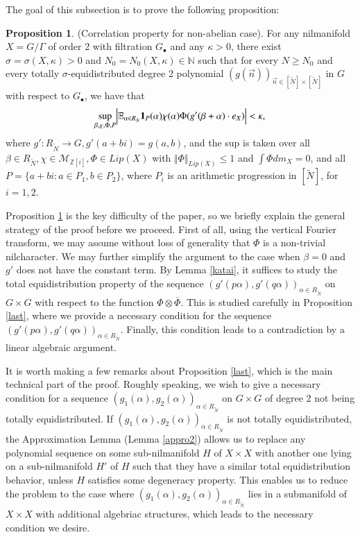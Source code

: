 \documentclass[12pt,amstex]{amsart}
\theoremstyle{definition}
\newtheorem{prop}[thm]{Proposition}
\def \Z {\mathbb{Z}[i]}
\def \A {\alpha}
\def \B {\beta}
\def \D {\kappa}
\def \R {R_{\tilde{N}}}
\begin{document}
The goal of this subsection is to prove the following proposition:

\begin{prop}\label{est1}(Correlation property for non-abelian case).
  For any nilmanifold $X=G/\Gamma$ of order 2 with filtration $G_{\bullet}$ and any $\D>0$, there exist $\sigma=\sigma(X,\D)>0$ and $N_{0}=N_{0}(X,\D)\in\mathbb{N}$ such that for every $N\geq N_{0}$ and every totally $\sigma$-equidistributed degree 2 polynomial $(g(\vec{n}))_{\vec{n}\in[\tilde{N}]\times[\tilde{N}]}$ in $G$ with respect to $G_{\bullet}$, we have that
  \begin{equation}\nonumber
  \begin{split}
    \sup_{\B,\chi,\Phi,P}\Bigl\vert\mathbb{E}_{\A\in \R}\bold{1}_{P}(\A)\chi(\A)\Phi(g'(\B+\A)\cdot e_{X})\Bigr\vert<\D,
  \end{split}
  \end{equation}
  where $g'\colon \R\rightarrow G, g'(a+bi)=g(a,b)$, and the sup is taken over all $\B\in \R, \chi\in\mathcal{M}_{\Z}, \Phi\in Lip(X)$ with $\Vert\Phi\Vert_{Lip(X)}\leq 1$ and $\int\Phi dm_{X}=0$, and all $P=\{a+bi\colon a\in P_{1}, b\in P_{2}\}$, where $P_{i}$ is an arithmetic progression in $[\tilde{N}]$, for $i=1,2$.
\end{prop}

Proposition \ref{est1} is the key difficulty of the paper, so we briefly explain the general strategy of the proof before we proceed. First of all, using the vertical Fourier transform, we may assume without loss of generality that $\Phi$ is a non-trivial nilcharacter. We may further simplify the argument to the case when $\B=0$ and $g'$ does not have the constant term. 
By Lemma \ref{katai}, it suffices to study the total equidistribution property of the sequence $(g'(p\A),g'(q\A))_{\A\in\R}$ on $G\times G$ with respect to the function $\Phi\otimes\overline{\Phi}$. This is studied carefully in Proposition \ref{last}, where we provide a necessary condition for the sequence $(g'(p\A),g'(q\A))_{\A\in\R}$. Finally, this condition leads to a contradiction by a linear algebraic argument.

It is worth making a few remarks about Proposition \ref{last}, which is the main technical part of the proof. Roughly speaking, we wish to give a necessary condition for a sequence $(g_{1}(\A),g_{2}(\A))_{\A\in\R}$ on $G\times G$ of degree 2 not being totally equidistributed. If $(g_{1}(\A),g_{2}(\A))_{\A\in\R}$ is not totally equidistributed, the Approximation Lemma (Lemma \ref{appro2}) allows us to replace any polynomial sequence on some sub-nilmanifold $H$ of $X\times X$ with another one lying on a sub-nilmanifold $H'$ of $H$ such that they have a similar total equidistribution behavior, unless $H$ satisfies some degeneracy property. This enables us to reduce the problem to the case where $(g_{1}(\A),g_{2}(\A))_{\A\in\R}$ lies in a submanifold of $X\times X$ with additional algebriac structures, which leads to the necessary condition we desire.
\end{document}
